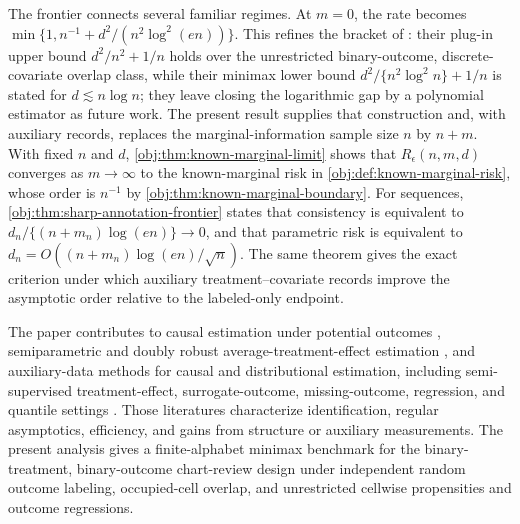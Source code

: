 \documentclass[11pt]{article}
\begin{document}
The frontier connects several familiar regimes. At \(m=0\), the rate becomes \(\min\{1,n^{-1}+d^2/(n^2\log^2(en))\}\). This refines the bracket of \citet[Theorems 1--2 and the discussion following Theorem 2]{ZengBalakrishnanHanKennedy2024}: their plug-in upper bound \(d^2/n^2+1/n\) holds over the unrestricted binary-outcome, discrete-covariate overlap class, while their minimax lower bound \(d^2/\{n^2\log^2 n\}+1/n\) is stated for \(d\lesssim n\log n\); they leave closing the logarithmic gap by a polynomial estimator as future work. The present result supplies that construction and, with auxiliary records, replaces the marginal-information sample size \(n\) by \(n+m\). With fixed \(n\) and \(d\), \cref{obj:thm:known-marginal-limit} shows that \(R_\epsilon(n,m,d)\) converges as \(m\to\infty\) to the known-marginal risk in \cref{obj:def:known-marginal-risk}, whose order is \(n^{-1}\) by \cref{obj:thm:known-marginal-boundary}. For sequences, \cref{obj:thm:sharp-annotation-frontier} states that consistency is equivalent to \(d_n/\{(n+m_n)\log(en)\}\to0\), and that parametric risk is equivalent to \(d_n=O((n+m_n)\log(en)/\sqrt n)\). The same theorem gives the exact criterion under which auxiliary treatment--covariate records improve the asymptotic order relative to the labeled-only endpoint.

The paper contributes to causal estimation under potential outcomes \citep{Rubin1974,RosenbaumRubin1983,ImbensRubin2015}, semiparametric and doubly robust average-treatment-effect estimation \citep{RobinsRotnitzkyZhao1994,Hahn1998,HiranoImbensRidder2003,BangRobins2005,Farrell2015,AtheyImbensWager2018,ChernozhukovChetverikovDemirerDufloHansenNeweyRobins2018,Kennedy2016}, and auxiliary-data methods for causal and distributional estimation, including semi-supervised treatment-effect, surrogate-outcome, missing-outcome, regression, and quantile settings \citep{ChengAnanthakrishnanCai2021,ChakraborttyLuCaiLi2019,ChakraborttyDai2024,ChakraborttyDaiCarroll2022,KallusMao2025,AnniwaerZhang2025,XuWittenShojaie2025}. Those literatures characterize identification, regular asymptotics, efficiency, and gains from structure or auxiliary measurements. The present analysis gives a finite-alphabet minimax benchmark for the binary-treatment, binary-outcome chart-review design under independent random outcome labeling, occupied-cell overlap, and unrestricted cellwise propensities and outcome regressions.
\end{document}
